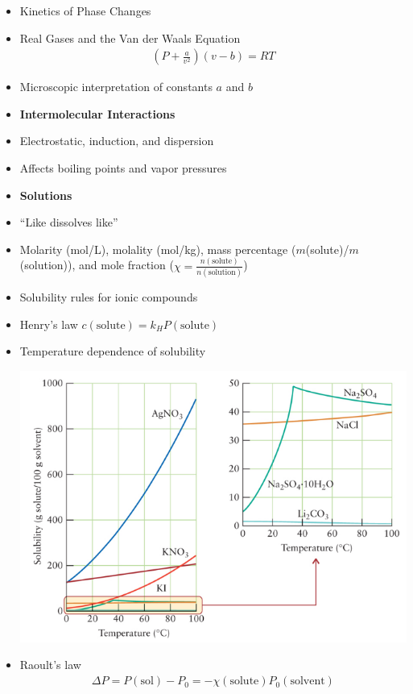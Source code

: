 \documentclass[11pt]{article}
\begin{document}
\begin{itemize}
\begin{center}
  \end{center}
\item Kinetics of Phase Changes
\item Real Gases and the Van der Waals Equation
  \begin{align*}
    (P+\frac{a}{v^2})(v-b) = RT
  \end{align*}
\item Microscopic interpretation of constants $a$ and $b$
\item[] \textbf{Intermolecular Interactions}
\item Electrostatic, induction, and dispersion
\item Affects boiling points and vapor pressures
\item[] \textbf{Solutions}
\item ``Like dissolves like''
\item Molarity (mol/L), molality (mol/kg), mass percentage ($m$(solute)/$m$(solution)),
  and mole fraction ($\chi = \frac{n(\text{solute})}{n(\text{solution})}$)
\item Solubility rules for ionic compounds
\item Henry's law $c(\text{solute}) = k_HP(\text{solute})$
\item Temperature dependence of solubility
  \begin{center}
    \includegraphics[scale=0.5]{solubility.png}
  \end{center}
\item Raoult's law
  \begin{align*}
    \Delta P = P(\text{sol}) - P_0 = -\chi(\text{solute})P_0(\text{solvent})
  \end{align*}

\end{itemize}
\end{document}
